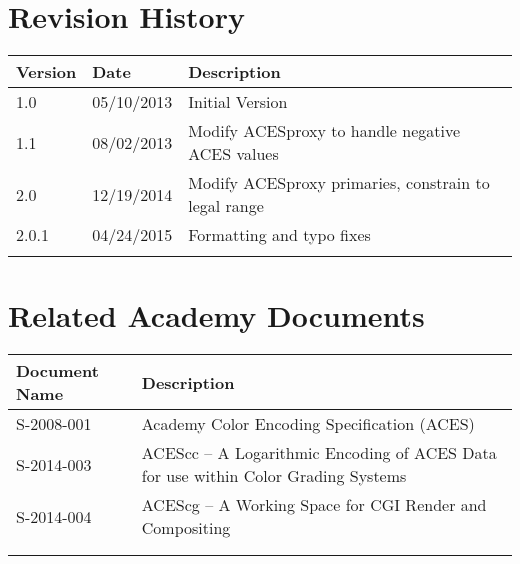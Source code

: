 \prelimsectionformat	%
\chapter{Revision History}

\begin{tabularx}{\linewidth}{|l|l|X|}
    \hline
    Version & Date & Description \\ \hline
    1.0     & 05/10/2013 & Initial Version      \\ \hline
    1.1     & 08/02/2013 & Modify ACESproxy to handle negative ACES values \\ \hline
    2.0     & 12/19/2014 & Modify ACESproxy primaries, constrain to legal range \\ \hline
    2.0.1   & 04/24/2015 & Formatting and typo fixes \\ \hline
            &      &             \\ \hline
\end{tabularx}

\vspace{0.25in} %
\chapter{Related Academy Documents} %
\begin{tabularx}{\linewidth}{|l|X|}
    \hline
    Document Name & Description \\ \hline
    S-2008-001  & Academy Color Encoding Specification (ACES) \\ \hline
    S-2014-003  & ACEScc -- A Logarithmic Encoding of ACES Data for use within Color Grading Systems \\ \hline
    S-2014-004  & ACEScg -- A Working Space for CGI Render and Compositing \\ \hline
    & \\ \hline
    & \\ \hline
\end{tabularx}